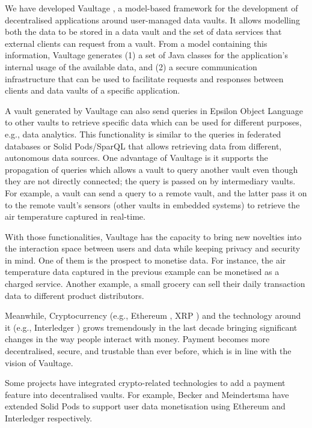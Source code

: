 \documentclass[]{article}
\begin{document}
	We have developed Vaultage \cite{yohannis2019towards,vaultage}, a model-based framework for the development of decentralised applications around user-managed data vaults.
	It allows modelling both the data to be stored in a data vault and the set of data services that external clients can request from a vault.
	From a model containing this information, Vaultage generates (1) a set of Java classes for the application's internal usage of the available data, and (2) a secure communication infrastructure that can be used to facilitate requests and responses between clients and data vaults of a specific application. 
	
	A vault generated by Vaultage can also send queries \cite{vaultage-query} in Epsilon Object Language \cite{epsilon} to other vaults to retrieve specific data which can be used for different purposes, e.g., data analytics. This functionality is similar to the queries in federated databases \cite{db2} or Solid Pods/SparQL \cite{comunica} that allows retrieving data from different, autonomous data sources. One advantage of Vaultage is it supports the propagation of queries which allows a vault to query another vault even though they are not directly connected; the query is passed on by intermediary vaults. For example, a vault can send a query to a remote vault, and the latter pass it on to the remote vault's sensors (other vaults in embedded systems) to retrieve the air temperature captured in real-time. 
	
	With those functionalities, Vaultage has the capacity to bring new novelties into the interaction space between users and data while keeping privacy and security in mind. One of them is the prospect to monetise data. For instance, the air temperature data captured in the previous example can be monetised as a charged service. Another example, a small grocery can sell their daily transaction data to different product distributors.  
	
	Meanwhile, Cryptocurrency (e.g., Ethereum \cite{ethereum},  XRP \cite{xrpl}) and the technology around it (e.g., Interledger \cite{interledger})  grows tremendously in the last decade bringing significant changes in the way people interact with money. Payment becomes more decentralised, secure, and trustable than ever before, which is in line with the vision of Vaultage.    
	
	Some projects have integrated crypto-related technologies to add a payment feature into decentralised vaults. For example, Becker \cite{becker2021monetising} and Meindertsma \cite{meindertsma2019web}  have extended Solid Pods to support user data monetisation using Ethereum and Interledger respectively. 
	
\end{document}
